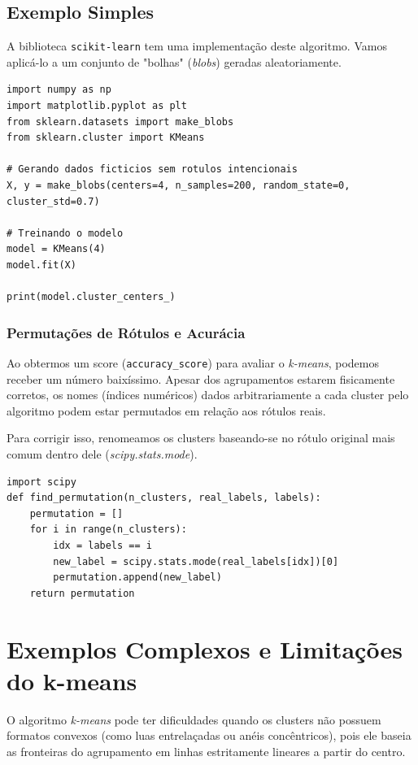 \documentclass[11pt,a4paper]{article}
\begin{document}
\subsection{Exemplo Simples}
A biblioteca \texttt{scikit-learn} tem uma implementação deste algoritmo. Vamos aplicá-lo a um conjunto de "bolhas" (\emph{blobs}) geradas aleatoriamente.

\begin{lstlisting}
import numpy as np
import matplotlib.pyplot as plt
from sklearn.datasets import make_blobs
from sklearn.cluster import KMeans

# Gerando dados ficticios sem rotulos intencionais
X, y = make_blobs(centers=4, n_samples=200, random_state=0, cluster_std=0.7)

# Treinando o modelo
model = KMeans(4)
model.fit(X)

print(model.cluster_centers_)
\end{lstlisting}

\subsubsection{Permutações de Rótulos e Acurácia}
Ao obtermos um score (\texttt{accuracy\_score}) para avaliar o \textit{k-means}, podemos receber um número baixíssimo. Apesar dos agrupamentos estarem fisicamente corretos, os nomes (índices numéricos) dados arbitrariamente a cada cluster pelo algoritmo podem estar permutados em relação aos rótulos reais.

Para corrigir isso, renomeamos os clusters baseando-se no rótulo original mais comum dentro dele (\textit{scipy.stats.mode}).

\begin{lstlisting}
import scipy
def find_permutation(n_clusters, real_labels, labels):
    permutation = []
    for i in range(n_clusters):
        idx = labels == i
        new_label = scipy.stats.mode(real_labels[idx])[0]
        permutation.append(new_label)
    return permutation
\end{lstlisting}

\section{Exemplos Complexos e Limitações do k-means}

O algoritmo \emph{k-means} pode ter dificuldades quando os clusters não possuem formatos convexos (como luas entrelaçadas ou anéis concêntricos), pois ele baseia as fronteiras do agrupamento em linhas estritamente lineares a partir do centro.
\end{document}
